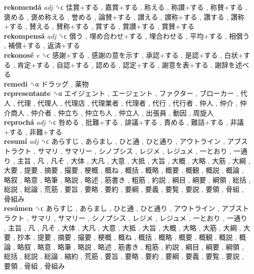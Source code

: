\textbf{rekomendá} \emph{adj}  ␝ϲ   佳賞+する ,  嘉賞+する ,  称える ,  称讃+する ,  称賛+する ,  褒める ,  褒め称える ,  誉める ,  論賛+する ,  讃える ,  讃称+する ,  讚する ,  讚称+する ,  賛える ,  賛称+する ,  賞する ,  賞讃+する ,  賞賛+する   \\
\textbf{rekompensá} \emph{adj}  ␝ϲ   償う ,  埋め合わせ+する ,  埋合わせる ,  平均+する ,  相償う ,  補償+する ,  返済+する   \\
\textbf{rekonosé} \emph{v}  ␝ϲ   感謝+する ,  感謝の意を示す ,  承認+する ,  是認+する ,  白状+する ,  肯定+する ,  自認+する ,  認める ,  認定+する ,  謝意を表+する ,  謝辞を述べる   \\
\textbf{remedi} ␝α   ドラッグ ,  薬物   \\
\textbf{representante} ␝α   エイジェント ,  エージェント ,  ファクター ,  ブローカー ,  代人 ,  代理 ,  代理人 ,  代理店 ,  代理業者 ,  代理者 ,  代行 ,  代行者 ,  仲人 ,  仲介 ,  仲介商人 ,  仲介者 ,  仲立ち ,  仲立ち人 ,  仲立人 ,  出張員 ,  動因 ,  周旋人   \\
\textbf{reprochá} \emph{adj}  ␝ϲ   咎める ,  批難+する ,  誹議+する ,  責める ,  難詰+する ,  非議+する ,  非難+する   \\
\textbf{resumí} \emph{adj}  ␝ϲ   あらすじ ,  あらまし ,  ひと通 ,  ひと通り ,  アウトライン ,  アブストラクト ,  サマリ ,  サマリー ,  シノプシス ,  レジメ ,  レジュメ ,  一とおり ,  一通り ,  主旨 ,  凡 ,  凡そ ,  大体 ,  大凡 ,  大意 ,  大抵 ,  大旨 ,  大概 ,  大略 ,  大筋 ,  大綱 ,  大要 ,  提要 ,  摘要 ,  撮要 ,  梗概 ,  概ね ,  概括 ,  概略 ,  概要 ,  概観 ,  概説 ,  概論 ,  略叙 ,  略意 ,  略筆 ,  略説 ,  略述 ,  筋書き ,  粗筋 ,  約説 ,  綱目 ,  綱要 ,  綱領 ,  総括 ,  総説 ,  総論 ,  荒筋 ,  要旨 ,  要略 ,  要約 ,  要綱 ,  要義 ,  要覧 ,  要説 ,  要領 ,  骨組 ,  骨組み   \\
\textbf{resúmen} ␝ϲ   あらすじ ,  あらまし ,  ひと通 ,  ひと通り ,  アウトライン ,  アブストラクト ,  サマリ ,  サマリー ,  シノプシス ,  レジメ ,  レジュメ ,  一とおり ,  一通り ,  主旨 ,  凡 ,  凡そ ,  大体 ,  大凡 ,  大意 ,  大抵 ,  大旨 ,  大概 ,  大略 ,  大筋 ,  大綱 ,  大要 ,  抄本 ,  提要 ,  摘要 ,  撮要 ,  梗概 ,  概ね ,  概括 ,  概略 ,  概要 ,  概観 ,  概説 ,  概論 ,  略叙 ,  略意 ,  略筆 ,  略説 ,  略述 ,  筋書き ,  粗筋 ,  約説 ,  綱目 ,  綱要 ,  綱領 ,  総括 ,  総説 ,  総論 ,  縮約 ,  荒筋 ,  要旨 ,  要略 ,  要約 ,  要綱 ,  要義 ,  要覧 ,  要説 ,  要領 ,  骨組 ,  骨組み   \\
